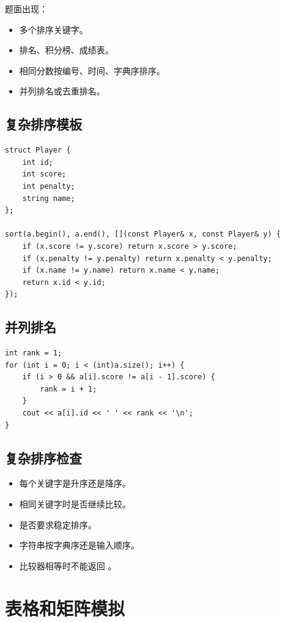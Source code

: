 题面出现：

\begin{itemize}
  \item 多个排序关键字。
  \item 排名、积分榜、成绩表。
  \item 相同分数按编号、时间、字典序排序。
  \item 并列排名或去重排名。
\end{itemize}

\subsection{复杂排序模板}

\begin{lstlisting}
struct Player {
    int id;
    int score;
    int penalty;
    string name;
};

sort(a.begin(), a.end(), [](const Player& x, const Player& y) {
    if (x.score != y.score) return x.score > y.score;
    if (x.penalty != y.penalty) return x.penalty < y.penalty;
    if (x.name != y.name) return x.name < y.name;
    return x.id < y.id;
});
\end{lstlisting}

\subsection{并列排名}

\begin{lstlisting}
int rank = 1;
for (int i = 0; i < (int)a.size(); i++) {
    if (i > 0 && a[i].score != a[i - 1].score) {
        rank = i + 1;
    }
    cout << a[i].id << ' ' << rank << '\n';
}
\end{lstlisting}

\subsection{复杂排序检查}

\begin{itemize}
  \item 每个关键字是升序还是降序。
  \item 相同关键字时是否继续比较。
  \item 是否要求稳定排序。
  \item 字符串按字典序还是输入顺序。
  \item 比较器相等时不能返回 。
\end{itemize}

\section{表格和矩阵模拟}\label{sec:07-17}

